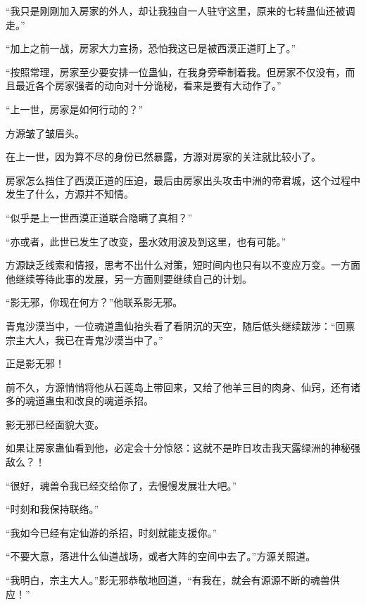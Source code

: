 \begin{this_body}
“我只是刚刚加入房家的外人，却让我独自一人驻守这里，原来的七转蛊仙还被调走。”

“加上之前一战，房家大力宣扬，恐怕我这已是被西漠正道盯上了。”

“按照常理，房家至少要安排一位蛊仙，在我身旁牵制着我。但房家不仅没有，而且最近各个房家强者的动向对十分诡秘，看来是要有大动作了。”

“上一世，房家是如何行动的？”

方源皱了皱眉头。

在上一世，因为算不尽的身份已然暴露，方源对房家的关注就比较小了。

房家怎么挡住了西漠正道的压迫，最后由房家出头攻击中洲的帝君城，这个过程中发生了什么，方源并不知情。

“似乎是上一世西漠正道联合隐瞒了真相？”

“亦或者，此世已发生了改变，墨水效用波及到这里，也有可能。”

方源缺乏线索和情报，思考不出什么对策，短时间内也只有以不变应万变。一方面他继续等待此事的发展，另一方面则要继续自己的计划。

“影无邪，你现在何方？”他联系影无邪。

青鬼沙漠当中，一位魂道蛊仙抬头看了看阴沉的天空，随后低头继续跋涉：“回禀宗主大人，我已在青鬼沙漠当中了。”

正是影无邪！

前不久，方源悄悄将他从石莲岛上带回来，又给了他羊三目的肉身、仙窍，还有诸多的魂道蛊虫和改良的魂道杀招。

影无邪已经面貌大变。

如果让房家蛊仙看到他，必定会十分惊怒：这就不是昨日攻击我天露绿洲的神秘强敌么？！

“很好，魂兽令我已经交给你了，去慢慢发展壮大吧。”

“时刻和我保持联络。”

“我如今已经有定仙游的杀招，时刻就能支援你。”

“不要大意，落进什么仙道战场，或者大阵的空间中去了。”方源关照道。

“我明白，宗主大人。”影无邪恭敬地回道，“有我在，就会有源源不断的魂兽供应！”

\end{this_body}

